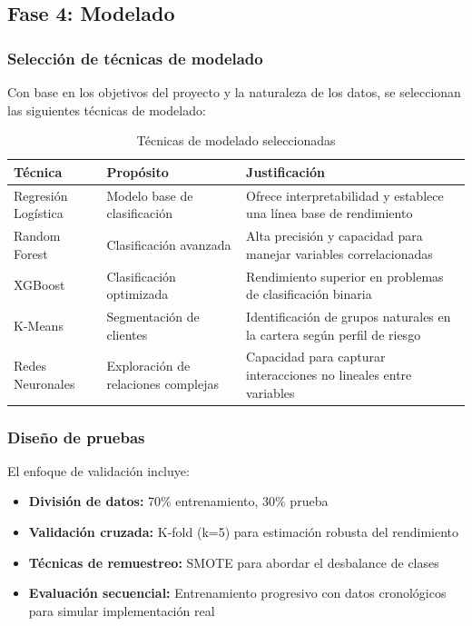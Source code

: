 \subsection{Fase 4: Modelado}
\subsubsection{Selección de técnicas de modelado}
Con base en los objetivos del proyecto y la naturaleza de los datos, se seleccionan las siguientes técnicas de modelado:

\begin{table}[ht]
\centering
\begin{tabular}{|p{3.5cm}|p{3.5cm}|p{7cm}|}
\hline
\textbf{Técnica} & \textbf{Propósito} & \textbf{Justificación} \\
\hline
Regresión Logística & Modelo base de clasificación & Ofrece interpretabilidad y establece una línea base de rendimiento \\
\hline
Random Forest & Clasificación avanzada & Alta precisión y capacidad para manejar variables correlacionadas \\
\hline
XGBoost & Clasificación optimizada & Rendimiento superior en problemas de clasificación binaria \\
\hline
K-Means & Segmentación de clientes & Identificación de grupos naturales en la cartera según perfil de riesgo \\
\hline
Redes Neuronales & Exploración de relaciones complejas & Capacidad para capturar interacciones no lineales entre variables \\
\hline
\end{tabular}
\caption{Técnicas de modelado seleccionadas}
\end{table}

\subsubsection{Diseño de pruebas}
El enfoque de validación incluye:

\begin{itemize}
    \item \textbf{División de datos:} 70\% entrenamiento, 30\% prueba
    \item \textbf{Validación cruzada:} K-fold (k=5) para estimación robusta del rendimiento
    \item \textbf{Técnicas de remuestreo:} SMOTE para abordar el desbalance de clases
    \item \textbf{Evaluación secuencial:} Entrenamiento progresivo con datos cronológicos para simular implementación real
\end{itemize}

